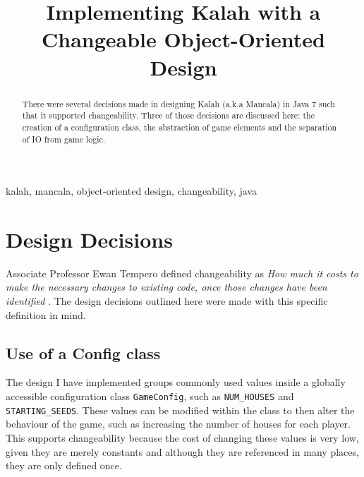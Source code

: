 \documentclass[10pt, a4paper, conference]{IEEEtran}
\begin{document}
\title{Implementing Kalah with a Changeable Object-Oriented Design\\
}

\author{
}

\maketitle

\begin{abstract}
There were several decisions made in designing Kalah (a.k.a Mancala) in Java
  7 such that it supported changeability. Three of those decisions are
  discussed here: the creation of a configuration class, the abstraction of
  game elements and the separation of IO from game logic.
\end{abstract}

\begin{IEEEkeywords}
kalah, mancala, object-oriented design, changeability, java
\end{IEEEkeywords}

\section{Design Decisions}

Associate Professor Ewan Tempero defined changeability as 
\textit{How much it costs to make the necessary changes to existing code, once those
changes have been identified} \cite{changeability}. The design decisions
outlined here were made with this specific definition in mind.

\subsection{Use of a Config class}
The design I have implemented groups commonly used values inside a globally
accessible configuration class \texttt{GameConfig}, such as
\texttt{NUM\_HOUSES} and \texttt{STARTING\_SEEDS}. These values can be modified
within the class to then alter the behaviour of the game, such as increasing
the number of houses for each player.
This supports changeability because the cost of changing these values is very
low, given they are merely constants and although they are referenced in many
places, they are only defined once.
\end{document}
